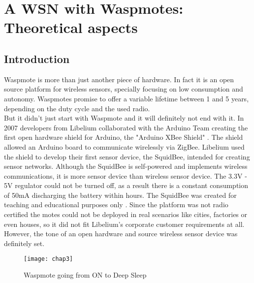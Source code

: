 \section{A WSN with Waspmotes: Theoretical aspects}
\label{Chapter3}
\subsection{Introduction}
Waspmote is more than just another piece of hardware. In fact it is an open source platform for wireless sensors, specially focusing on low consumption and autonomy. Waspmotes promise to offer a variable lifetime between 1 and 5 years, depending on the duty cycle and the used radio.\\ 
But it didn't just start with Waspmote and it will definitely not end with it. In 2007 developers from Libelium collaborated with the Arduino Team creating the first open hardware shield for Arduino, the "Arduino XBee Shield" . The shield allowed an Arduino board to communicate wirelessly via ZigBee. Libelium used the shield to develop their first sensor device, the SquidBee, intended for creating sensor networks. Although the SquidBee is self-powered and implements wireless communications, it is more sensor device than wireless sensor device. The 3.3V - 5V regulator could not be turned off, as a result there is a constant consumption of 50mA discharging the battery within hours. The SquidBee was created for teaching and educational purposes only . Since the platform was not radio certified the motes could not be deployed in real scenarios like cities, factories or even houses, so it did not fit Libelium's corporate customer requirements at all. However, the tone of an open hardware and source wireless sensor device was definitely set.
\begin{figure*}[ht]
\centering
\texttt{[image: chap3]}
\caption{Waspmote going from ON to Deep Sleep}
\label{fig:chap3}
\end{figure*}\\
